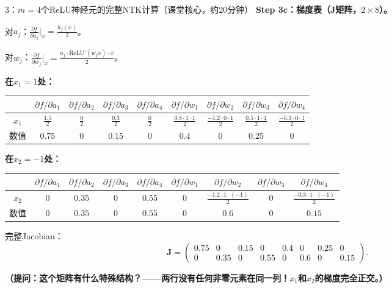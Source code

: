 \documentclass[11pt,a4paper]{article}
\newcommand{\bJ}{\mathbf{J}}
\begin{document}
\begin{handcalc}{3：$m=4$个ReLU神经元的完整NTK计算（课堂核心，约20分钟）}
\bigskip
\textbf{Step 3c：梯度表（$\bJ$矩阵，$2\times 8$）。}

对$a_j$：$\frac{\partial f}{\partial a_j}\big|_x = \frac{h_j(x)}{2}$。

对$w_j$：$\frac{\partial f}{\partial w_j}\big|_x = \frac{a_j\cdot\text{ReLU}'(w_j x)\cdot x}{2}$。

\medskip
\textbf{在$x_1=1$处：}
\begin{center}
\small
\begin{tabular}{c|cccc|cccc}
\toprule
& $\partial f/\partial a_1$ & $\partial f/\partial a_2$ & $\partial f/\partial a_3$ & $\partial f/\partial a_4$ & $\partial f/\partial w_1$ & $\partial f/\partial w_2$ & $\partial f/\partial w_3$ & $\partial f/\partial w_4$ \\
\midrule
$x_1$ & $\frac{1.5}{2}$ & $\frac{0}{2}$ & $\frac{0.3}{2}$ & $\frac{0}{2}$ & $\frac{0.8\cdot 1\cdot 1}{2}$ & $\frac{-1.2\cdot 0\cdot 1}{2}$ & $\frac{0.5\cdot 1\cdot 1}{2}$ & $\frac{-0.3\cdot 0\cdot 1}{2}$ \\[4pt]
数值 & $0.75$ & $0$ & $0.15$ & $0$ & $0.4$ & $0$ & $0.25$ & $0$ \\
\bottomrule
\end{tabular}
\end{center}

\textbf{在$x_2=-1$处：}
\begin{center}
\small
\begin{tabular}{c|cccc|cccc}
\toprule
& $\partial f/\partial a_1$ & $\partial f/\partial a_2$ & $\partial f/\partial a_3$ & $\partial f/\partial a_4$ & $\partial f/\partial w_1$ & $\partial f/\partial w_2$ & $\partial f/\partial w_3$ & $\partial f/\partial w_4$ \\
\midrule
$x_2$ & $0$ & $0.35$ & $0$ & $0.55$ & $0$ & $\frac{-1.2\cdot 1\cdot(-1)}{2}$ & $0$ & $\frac{-0.3\cdot 1\cdot(-1)}{2}$ \\[4pt]
数值 & $0$ & $0.35$ & $0$ & $0.55$ & $0$ & $0.6$ & $0$ & $0.15$ \\
\bottomrule
\end{tabular}
\end{center}

完整Jacobian：
\[
\bJ = \begin{pmatrix}
0.75 & 0 & 0.15 & 0 & 0.4 & 0 & 0.25 & 0 \\
0 & 0.35 & 0 & 0.55 & 0 & 0.6 & 0 & 0.15
\end{pmatrix}.
\]

\textbf{（提问：这个矩阵有什么特殊结构？——两行没有任何非零元素在同一列！$x_1$和$x_2$的梯度完全正交。）}


\end{handcalc}
\end{document}
